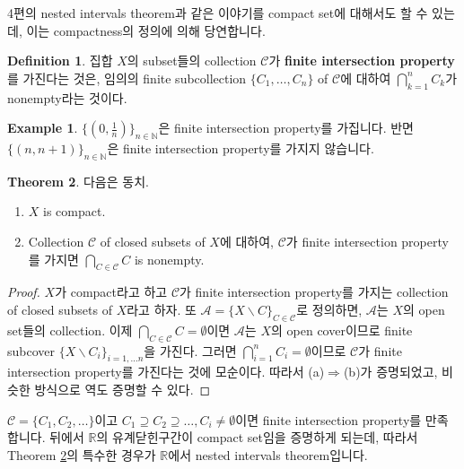 \documentclass[12pt]{article}
\theoremstyle{definition}
\newtheorem{thm}{Theorem}[section]
\newtheorem{defn}[thm]{Definition}
\newtheorem*{ex}{Example}
\def\NN{\mathbb{N}}
\def\RR{\mathbb{R}}
\begin{document}
4편의 nested intervals theorem과 같은 이야기를 compact set에 대해서도 할 수 있는데, 이는 compactness의 정의에 의해 당연합니다.

	\begin{defn}
		집합 \(X\)의 subset들의 collection \(\mathcal{C}\)가 \textbf{finite intersection property}를 가진다는 것은, 임의의 finite subcollection \(\{C_1, \ldots, C_n\}\) of \(\mathcal{C}\)에 대하여 \(\bigcap_{k=1}^n C_k\)가 nonempty라는 것이다.
	\end{defn}

	\begin{ex}
		\(\{(0, \frac{1}{n})\}_{n \in \NN}\)은 finite intersection property를 가집니다. 반면 \(\{(n, n+1)\}_{n \in \NN}\)은 finite intersection property를 가지지 않습니다.
	\end{ex}

	\begin{thm} \label{thm fip}
		다음은 동치.
		\begin{enumerate}[label=(\alph*), leftmargin=2\parindent]
			\item
			\(X\) is compact.
			\item
			Collection \(\mathcal{C}\) of closed subsets of \(X\)에 대하여, \(\mathcal{C}\)가 finite intersection property를 가지면 \(\bigcap_{C \in \mathcal{C}} C\) is nonempty.
		\end{enumerate}	
	\end{thm}

	\begin{proof}
		\(X\)가 compact라고 하고 \(\mathcal{C}\)가 finite intersection property를 가지는 collection of closed subsets of \(X\)라고 하자. 또 \(\mathcal{A} = \{X \backslash C\}_{C \in \mathcal{C}}\)로 정의하면, \(\mathcal{A}\)는 \(X\)의 open set들의 collection. 이제 \(\bigcap_{C \in \mathcal{C}} C = \emptyset\)이면 \(\mathcal{A}\)는 \(X\)의 open cover이므로 finite subcover \(\{X \backslash C_i\}_{i = 1, \ldots n}\)을 가진다. 그러면 \(\bigcap_{i=1}^n C_i = \emptyset\)이므로 \(\mathcal{C}\)가 finite intersection property를 가진다는 것에 모순이다. 따라서 (a)$\Rightarrow$(b)가 증명되었고, 비슷한 방식으로 역도 증명할 수 있다.
	\end{proof}

\(\mathcal{C} = \{C_1, C_2, \ldots\}\)이고 \(C_1 \supseteq C_2 \supseteq \ldots, C_i \neq \emptyset\)이면 finite intersection property를 만족합니다. 뒤에서 \(\RR\)의 유계닫힌구간이 compact set임을 증명하게 되는데, 따라서 Theorem \ref{thm fip}의 특수한 경우가 \(\RR\)에서 nested intervals theorem입니다. 
\end{document}
